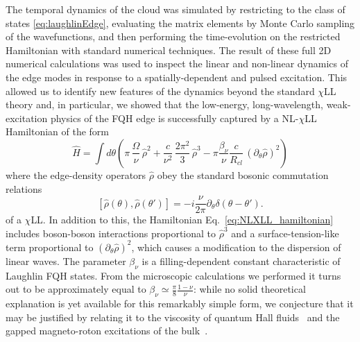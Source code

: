 \documentclass[twocolumn,pra,superscriptaddress,noshowpacs]{revtex4}
\newcommand{\nlchill}{NL-$\chi$LL }
\begin{document}
The temporal dynamics of the cloud was simulated by restricting to the class of states \eqref{eq:laughlinEdge}, evaluating the matrix elements by Monte Carlo sampling of the wavefunctions, and then performing the time-evolution on the restricted Hamiltonian with standard numerical techniques.
The result of these full 2D numerical calculations was used to inspect the linear and non-linear dynamics of the edge modes in response to a spatially-dependent and pulsed excitation. This allowed us to identify new features of the dynamics beyond the standard $\chi$LL theory and, in particular, we showed that the low-energy, long-wavelength, weak-excitation physics of the FQH edge is successfully captured by a \nlchill Hamiltonian of the form
\begin{equation}
        \label{eq:NLXLL_hamiltonian}
    	\hat{H}=\int d\theta\left(\pi\,\frac{\Omega}{\nu}\,\hat{\rho}^2+\frac{c}{\nu^2}\,\frac{2\pi^2}{3}\,\hat{\rho}^3-\pi\frac{\beta_\nu}{\nu}\frac{c}{R_{cl}}\,\left(\partial_\theta\hat{\rho}\right)^2\right)
\end{equation}
where the edge-density operators $\hat{\rho}$ obey the standard bosonic commutation relations~\cite{Wen_AdvPhys_1995}
\begin{equation}
        \label{eq:KacMoodyCommutator}
        [\hat{\rho}(\theta),\hat{\rho}(\theta')]=-i \frac{\nu}{2\pi} \partial_\theta\delta(\theta-\theta').
\end{equation}
of a $\chi$LL. In addition to this, the Hamiltonian Eq.~\eqref{eq:NLXLL_hamiltonian} includes boson-boson interactions proportional to $\hat{\rho}^3$ and a surface-tension-like term proportional to $(\partial_\theta\hat{\rho})^2$, which causes a modification to the dispersion of linear waves.
The parameter $\beta_\nu$ is a filling-dependent constant characteristic of Laughlin FQH states. From the microscopic calculations we performed it turns out to be approximately equal to $\beta_\nu\simeq\frac{\pi}{8}\frac{1-\nu}{\nu}$: while no solid theoretical explanation is yet available for this remarkably simple form, we conjecture that it may be justified by relating it to the viscosity of quantum Hall fluids~\cite{Avron_PRL_1995} and the gapped magneto-roton excitations of the bulk~\cite{GMP_PRB_1986}.
    
\end{document}
